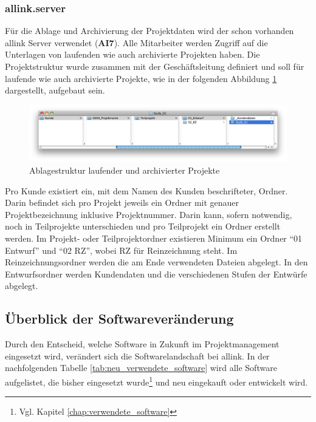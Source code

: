 \subsubsection{allink.server}
Für die Ablage und Archivierung der Projektdaten wird der schon vorhanden
allink Server verwendet (\textbf{AI7}). Alle Mitarbeiter werden Zugriff auf die Unterlagen
von laufenden wie auch archivierte Projekten haben. Die Projektstruktur
wurde zusammen mit der Geschäftsleitung definiert und soll für laufende
wie auch archivierte Projekte, wie in der folgenden Abbildung \ref{pic:05_ablagestruktur} 
dargestellt, aufgebaut sein.

\begin{figure}[htbp]
\begin{center}
\includegraphics[width=1.0\textwidth,angle=0]{./bilder/loesung/05_ablagestruktur.png}
\caption[Ablagestruktur laufender und archivierter Projekte]{Ablagestruktur 
    laufender und archivierter Projekte\footnotemark}
\label{pic:05_ablagestruktur}
\end{center}
\end{figure}

Pro Kunde existiert ein, mit dem Namen des Kunden beschrifteter, Ordner. Darin befindet
sich pro Projekt jeweils ein Ordner mit genauer Projektbezeichnung inklusive Projektnummer.
Darin kann, sofern notwendig, noch in Teilprojekte unterschieden und
pro Teilprojekt ein Ordner erstellt werden. Im Projekt- oder Teilprojektordner
existieren Minimum ein Ordner ``01 Entwurf'' und ``02 RZ'', wobei RZ für Reinzeichnung
steht. Im Reinzeichnungsordner werden die am Ende verwendeten Dateien abgelegt.
In den Entwurfsordner werden Kundendaten und die verschiedenen Stufen der Entwürfe
abgelegt.

\subsection{Überblick der Softwareveränderung}
Durch den Entscheid, welche Software in Zukunft im Projektmanagement eingesetzt
wird, verändert sich die Softwarelandschaft bei allink. In der nachfolgenden
Tabelle \ref{tab:neu_verwendete_software} wird alle Software aufgelistet, die 
bisher eingesetzt wurde\footnote{Vgl. Kapitel \ref{chap:verwendete_software}} 
und neu eingekauft oder entwickelt wird.

